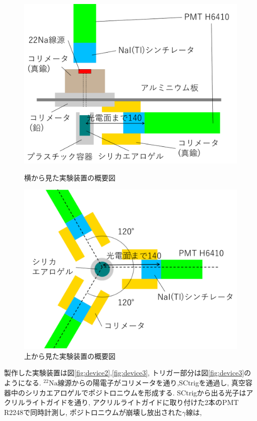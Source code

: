 \begin{figure}[H]
\begin{minipage}{0.5\hsize}
\centering
\includegraphics[keepaspectratio,scale=0.3]{fig/ybm/device5.pdf}
\caption{横から見た実験装置の概要図}
\label{fig:device5}
\end{minipage}
\begin{minipage}{0.5\hsize}
\centering
\includegraphics[keepaspectratio,scale=0.3]{fig/ybm/device6.pdf}
\caption{上から見た実験装置の概要図}
\label{fig:device6}
\end{minipage}
\end{figure}

製作した実験装置は図\ref{fig:device2},\ref{fig:device3},
トリガー部分は図\ref{fig:device3}のようになる.
$\mathrm{^{22}Na}$線源からの陽電子がコリメータを通り,SCtrigを通過し,
真空容器中のシリカエアロゲルでポジトロニウムを形成する.
SCtrigから出る光子はアクリルライトガイドを通り,
アクリルライトガイドに取り付けた2本のPMT R2248で同時計測し,
ポジトロニウムが崩壊し放出された$\gamma$線は,

